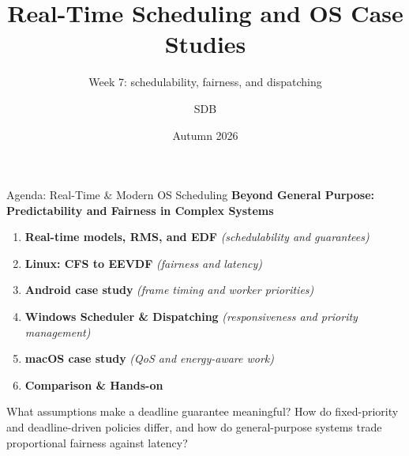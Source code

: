 \documentclass[aspectratio=169,11pt]{beamer}
\title[Scheduling]{Real-Time Scheduling and OS Case Studies}
\subtitle{Week 7: schedulability, fairness, and dispatching}
\author{SDB}
\date{Autumn 2026}
\begin{document}
\begin{frame}
    \titlepage
\end{frame}

% 
\begin{frame}{Agenda: Real-Time \& Modern OS Scheduling}
  \footnotesize
  \textbf{Beyond General Purpose: Predictability and Fairness in Complex Systems}
  \begin{enumerate}
    \item \textbf{Real-time models, RMS, and EDF} \hfill \textit{(schedulability and guarantees)}
    \item \textbf{Linux: CFS to EEVDF} \hfill \textit{(fairness and latency)}
    \item \textbf{Android case study} \hfill \textit{(frame timing and worker priorities)}
    \item \textbf{Windows Scheduler \& Dispatching} \hfill \textit{(responsiveness and priority management)}
    \item \textbf{macOS case study} \hfill \textit{(QoS and energy-aware work)}
    \item \textbf{Comparison \& Hands-on}
  \end{enumerate}
  \vspace{0.3cm}
  \pause
  \begin{tcolorbox}[title=\textbf{Think Ahead: When Predictability is Paramount}, colback=blue!5!white, colframe=blue!75!black, fonttitle=\bfseries]
  What assumptions make a deadline guarantee meaningful? How do fixed-priority and deadline-driven policies differ, and how do general-purpose systems trade proportional fairness against latency?
  \end{tcolorbox}
\end{frame}
\end{document}
